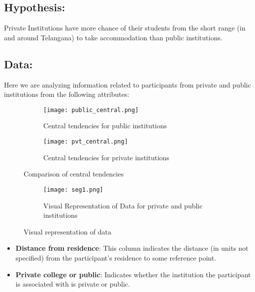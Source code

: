 \documentclass[oneside]{book}
\begin{document}
\subsection*{Hypothesis:}
Private Institutions have more chance of their students from the short range (in and around Telangana) to take accommodation than public institutions.

\subsection*{Data: }

Here we are analyzing information related to participants from private and public institutions from the following attributes:
\begin{figure}[h!]
    \centering
    \begin{subfigure}{0.45\textwidth} %
        \centering
        \texttt{[image: public\_central.png]}
        \caption{Central tendencies for public institutions}
        \label{fig:public_central}
    \end{subfigure}
    \hfill
    \begin{subfigure}{0.45\textwidth} %
        \centering
        \texttt{[image: pvt\_central.png]}
        \caption{Central tendencies for private institutions}
        \label{fig:pvt_central}
    \end{subfigure}
    \caption{Comparison of central tendencies}
    \label{fig:central_tendencies}
\end{figure}
\begin{figure}[h!]
    \centering
    \begin{subfigure}{0.45\textwidth} %
        \centering
        \texttt{[image: seg1.png]}
        \caption{Visual Representation of Data for private and public institutions}
        \label{fig:seg_hist}
    \end{subfigure}
    \caption{Visual representation of data}
    \label{fig:visual_representation}
\end{figure}

\begin{itemize}
    \item \textbf{Distance from residence}: This column indicates the distance (in units not specified) from the participant's residence to some reference point.
    \item \textbf{Private college or public}: Indicates whether the institution the participant is associated with is private or public.
\end{itemize}
\end{document}
